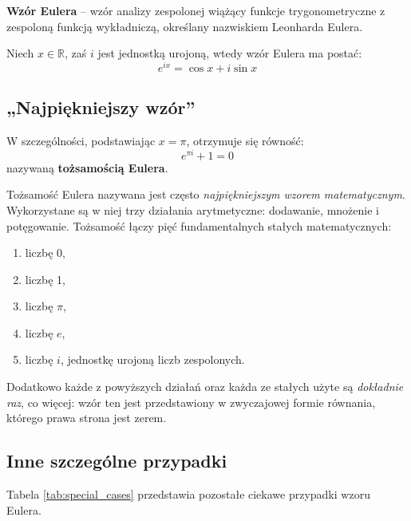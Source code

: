 \textbf{Wzór Eulera} – wzór analizy zespolonej wiążący funkcje trygonometryczne z zespoloną funkcją wykładniczą, określany nazwiskiem Leonharda Eulera.

Niech $ x\in\mathbb{R} $, zaś $ i $ jest jednostką urojoną, wtedy wzór Eulera ma postać:
$$ e^{ix} = \cos x + i\sin x $$

\subsection{„Najpiękniejszy wzór”}
W szczególności, podstawiając $ x = \pi $, otrzymuje się równość:
$$ e^{\pi i} + 1 = 0 $$
nazywaną \textbf{tożsamością Eulera}.

Tożsamość Eulera nazywana jest często \textit{najpiękniejszym wzorem matematycznym}. Wykorzystane są w niej trzy działania arytmetyczne: dodawanie, mnożenie i potęgowanie. Tożsamość łączy pięć fundamentalnych stałych matematycznych:

\begin{enumerate}
    \item liczbę 0,
    \item liczbę 1,
    \item liczbę $ \pi $,
    \item liczbę $ e $,
    \item liczbę $ i $, jednostkę urojoną liczb zespolonych.
\end{enumerate}

Dodatkowo każde z powyższych działań oraz każda ze stałych użyte są \textit{dokładnie raz}, co więcej: wzór ten jest przedstawiony w zwyczajowej formie równania, którego prawa strona jest zerem.

\subsection{Inne szczególne przypadki}

Tabela \ref{tab:special_cases} przedstawia pozostałe ciekawe przypadki wzoru Eulera.

